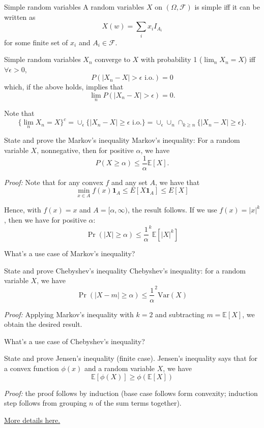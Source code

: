 \documentclass[avery5388,grid,frame]{flashcards}
\newcommand{\E}{\mathbb{E}}
\newcommand{\Var}{\text{Var}}
\newcommand{\F}{\mathcal F}
\begin{document}
\begin{flashcard}
    {Simple random variables}
    A random variables $X$ on $(\Omega, \F)$ is simple iff it can be written as
    $$X(w) = \sum_i x_i I_{A_i}$$
    for some finite set of $x_i$ and $A_i \in \F$.

    Simple random variables $X_n$ converge to $X$ with probability 1 ($\lim_n X_n = X$) iff $\forall \epsilon > 0$,
    $$P(|X_n - X| > \epsilon \text{ i.o.}) = 0$$
    which, if the above holds, implies that
    $$\lim_n P(|X_n - X| > \epsilon) = 0.$$

    Note that
    $$\{ \lim_n X_n = X \}^c = \cup_\epsilon \{ | X_n - X | \geq \epsilon \text{ i.o.} \} = \cup_\epsilon \cup_n \cap_{k \geq n} \{ |X_n - X| \geq \epsilon \}.$$
\end{flashcard}


\begin{flashcard}
    {State and prove the Markov's inequality}
    Markov's inequality: For a random variable $X$, nonnegative, then for positive $\alpha$, we have
    $$P(X \geq \alpha) \leq \frac 1 \alpha \E[X].$$

    \emph{Proof:} Note that for any convex $f$ and any set $A$, we have that
    $$\min_{x \in A} f(x) \mathbf 1_{A} \leq E[X \mathbf 1_{A}] \leq E[X]$$

    Hence, with $f(x) = x$ and $A = [\alpha,\infty)$, the result follows. If we use $f(x) = |x|^k$, then we have for positive $\alpha$:
    $$\Pr(|X| \geq \alpha) \leq \frac 1 \alpha^k \E[|X|^k]$$
\end{flashcard}


\begin{flashcard}
    {What's a use case of Markov's inequality?}
\end{flashcard}


\begin{flashcard}
    {State and prove Chebyshev's inequality}
    Chebyshev's inequality: for a random variable $X$, we have
    $$\Pr(|X - m| \geq \alpha) \leq \frac 1 \alpha^2 \Var(X)$$

    \emph{Proof:} Applying Markov's inequality with $k=2$ and subtracting $m = \E[X]$, we obtain the desired result.
\end{flashcard}


\begin{flashcard}
    {What's a use case of Chebyshev's inequality?}
\end{flashcard}


\begin{flashcard}
    {State and prove Jensen's inequality (finite case).}
    Jensen's inequality says that for a convex function $\phi(x)$ and a random variable $X$, we have
    $$\E[\phi(X)] \geq \phi(\E[X])$$

    \emph{Proof:} the proof follows by induction (base case follows form convexity; induction step follows from grouping $n$ of the sum terms together).

    \href{https://en.wikipedia.org/wiki/Jensen%27s_inequality#Proofs}{More details here.}
\end{flashcard}
\end{document}
